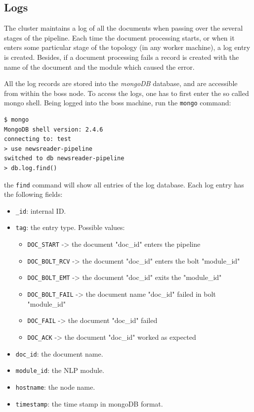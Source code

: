 \documentclass[a4]{article}
\begin{document}
\subsection*{Logs}
\label{sec:logs}

The cluster maintains a log of all the documents when passing over the
several stages of the pipeline. Each time the document processing starts, or
when it enters some particular stage of the topology (in any worker
machine), a log entry is created. Besides, if a document processing fails a
record is created with the name of the document and the module which caused
the error.

All the log records are stored into the \emph{mongoDB} database, and are
accessible from within the boss node. To access the logs, one has to first
enter the so called mongo shell. Being logged into the boss machine, run the
\texttt{mongo} command:

\begin{verbatim}
$ mongo
MongoDB shell version: 2.4.6
connecting to: test
> use newsreader-pipeline
switched to db newsreader-pipeline
> db.log.find()
\end{verbatim}

the \texttt{find} command will show all entries of the log database. Each
log entry has the following fields:
\begin{itemize}
\item \texttt{\_id}: internal ID.
\item \texttt{tag}: the entry type. Possible values:
  \begin{itemize}
  \item \texttt{DOC\_START}    -> the document "doc\_id" enters the pipeline
  \item \texttt{DOC\_BOLT\_RCV} -> the document "doc\_id" enters the bolt  "module\_id"
  \item \texttt{DOC\_BOLT\_EMT} -> the document "doc\_id" exits the "module\_id"
  \item \texttt{DOC\_BOLT\_FAIL} -> the document name "doc\_id" failed in bolt "module\_id"
  \item \texttt{DOC\_FAIL} -> the document "doc\_id" failed
  \item \texttt{DOC\_ACK} -> the document "doc\_id" worked as expected
  \end{itemize}
\item \texttt{doc\_id}: the document name.
\item \texttt{module\_id}: the NLP module.
\item \texttt{hostname}: the node name.
\item \texttt{timestamp}: the time stamp in mongoDB format.
\end{itemize}
\end{document}
